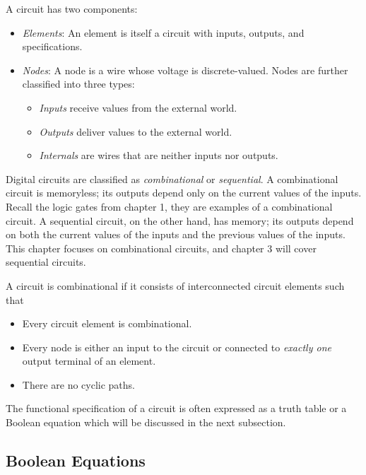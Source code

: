 \documentclass[12pt]{article}
\begin{document}
\newpage

A circuit has two components:

\begin{itemize}
  \item \textit{Elements}: An element is itself a circuit with inputs, outputs, and specifications.
  \item \textit{Nodes}: A node is a wire whose voltage is discrete-valued. Nodes are further classified into three types:
  \begin{itemize}
    \item \textit{Inputs} receive values from the external world.
    \item \textit{Outputs} deliver values to the external world.
    \item \textit{Internals} are wires that are neither inputs nor outputs.
  \end{itemize}
\end{itemize}

Digital circuits are classified as \textit{combinational} or \textit{sequential}. A combinational circuit is memoryless; its outputs depend only on the current values of the inputs. Recall the logic gates from chapter 1, they are examples of a combinational circuit. A sequential circuit, on the other hand, has memory; its outputs depend on both the current values of the inputs and the previous values of the inputs. This chapter focuses on combinational circuits, and chapter 3 will cover sequential circuits.

A circuit is combinational if it consists of interconnected circuit elements such that

\begin{itemize}
  \item Every circuit element is combinational.
  \item Every node is either an input to the circuit or connected to \textit{exactly one} output terminal of an element.
  \item There are no cyclic paths.
\end{itemize}

The functional specification of a circuit is often expressed as a truth table or a Boolean equation which will be discussed in the next subsection.

\subsection{Boolean Equations}
\end{document}
